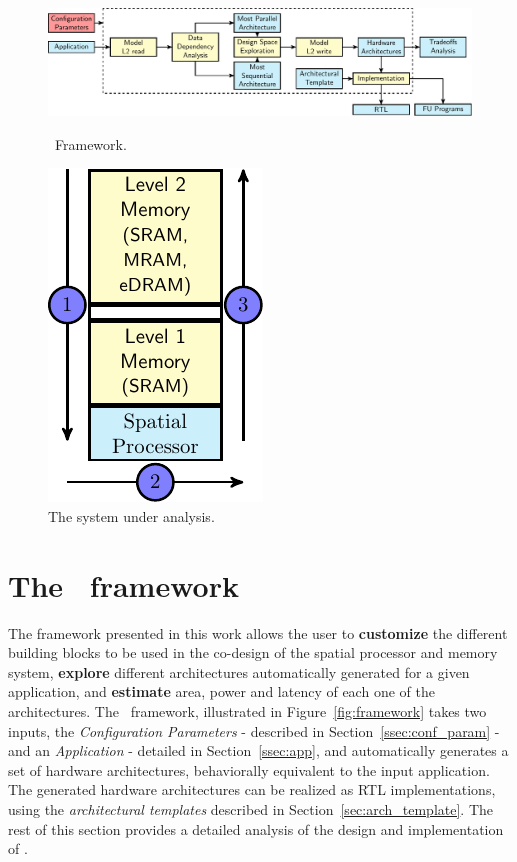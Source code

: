 \begin{figure}[!ht]
\begin{minipage}{.7\textwidth}
\includegraphics[width=\textwidth,left]{images/framework_v2.pdf}
  \caption{\small \frameworkname~Framework.}{}
  \label{fig:framework}
\end{minipage}%
\begin{minipage}{.3\textwidth}
    \centering
\includegraphics[width=.4\textwidth]{images/architecture_v2.pdf}
\caption{\small The system under analysis.
    }
\label{fig:system}
\end{minipage}
\squeezeup
\squeezeup
\end{figure}
\section{The \frameworkname~framework}
\label{sec:framework}
The framework presented in this work allows the user to \textbf{customize} the different building blocks to be used in the co-design of the spatial processor and memory system, \textbf{explore} different architectures automatically generated for a given application, and \textbf{estimate} area, power and latency of each one of the architectures. The \frameworkname~framework, illustrated in Figure~\ref{fig:framework} takes two inputs, the \textit{Configuration Parameters} - described in Section~\ref{ssec:conf_param} - and an \textit{Application} - detailed in Section~\ref{ssec:app}, and automatically generates a set of hardware architectures, behaviorally equivalent to the input application.
The generated hardware architectures can be realized as RTL implementations, using the \textit{architectural templates} described in Section~\ref{sec:arch_template}.
The rest of this section provides a detailed analysis of the design and implementation of \frameworkname.

